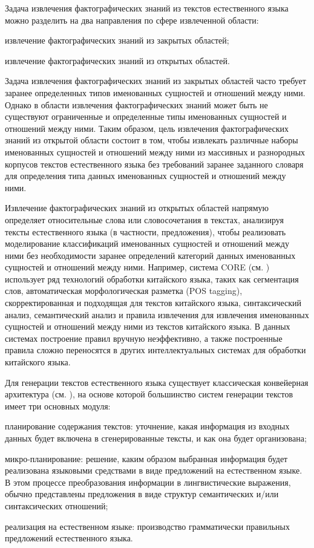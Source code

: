 Задача извлечения фактографических знаний из текстов естественного языка можно разделить на два направления по сфере извлеченной области:
\begin{textitemize}
	\item извлечение фактографических знаний из закрытых областей;
	\item извлечение фактографических знаний из открытых областей.
\end{textitemize}

Задача извлечения фактографических знаний из закрытых областей часто требует заранее определенных типов именованных сущностей и отношений между ними. Однако в области извлечения фактографических знаний может быть не существуют ограниченные и определенные типы именованных сущностей и отношений между ними. Таким образом, цель извлечения фактографических знаний из открытой области состоит в том, чтобы извлекать различные наборы именованных сущностей и отношений между ними из массивных и разнородных корпусов текстов естественного языка без требований заранее заданного словаря для определения типа данных именованных сущностей и отношений между ними.

Извлечение фактографических знаний из открытых областей напрямую определяет относительные слова или словосочетания в текстах, анализируя тексты естественного языка (в частности, предложения), чтобы реализовать моделирование классификаций именованных сущностей и отношений между ними без необходимости заранее определений категорий данных именованных сущностей и отношений между ними.  Например, система CORE (см. ) использует ряд технологий обработки китайского языка, таких как сегментация слов, автоматическая морфологическая разметка (POS tagging), скорректированная и подходящая для текстов китайского языка, синтаксический анализ, семантический анализ и правила извлечения для извлечения именованных сущностей и отношений между ними из текстов китайского языка. В данных системах построение правил вручную неэффективно, а также построенные правила сложно переносятся в других интеллектуальных системах для обработки китайского языка.

Для генерации текстов естественного языка существует классическая конвейерная архитектура (см. ), на основе которой большинство систем генерации текстов имеет три основных модуля:
\begin{textitemize}
	\item планирование содержания текстов: уточнение, какая информация из входных данных будет включена в сгенерированные тексты, и как она будет организована;
	\item микро-планирование: решение, каким образом выбранная информация будет реализована языковыми средствами в виде предложений на естественном языке. В этом процессе преобразования информации в лингвистические выражения, обычно представлены предложения в виде структур семантических и/или синтаксических отношений;
	\item реализация на естественном языке: производство грамматически правильных предложений естественного языка.
\end{textitemize}


